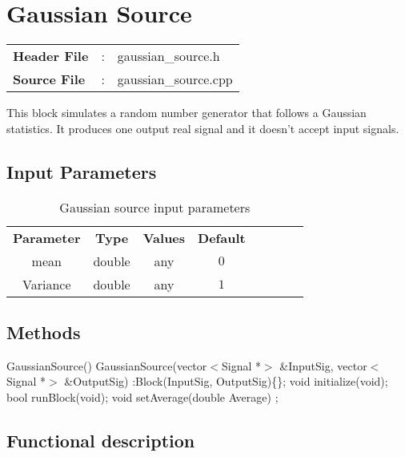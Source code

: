 \clearpage

\section{Gaussian Source}

\begin{tcolorbox}	
	\begin{tabular}{p{2.75cm} p{0.2cm} p{10.5cm}} 	
		\textbf{Header File}   &:& gaussian\_source.h \\
		\textbf{Source File}   &:& gaussian\_source.cpp \\
	\end{tabular}
\end{tcolorbox}

This block simulates a random number generator that follows a Gaussian statistics. It produces one output real signal and it doesn't accept input signals.

\subsection*{Input Parameters}

\begin{table}[h]
	\centering
	\begin{tabular}{|c|c|c|c|cccc}
		\cline{1-4}
		\textbf{Parameter} & \textbf{Type} & \textbf{Values} &   \textbf{Default}& \\ \cline{1-4}
		mean & double & any & $0$ \\ \cline{1-4}
		Variance & double & any & $1$ \\ \cline{1-4}
	\end{tabular}
	\caption{Gaussian source input parameters}
	\label{table_Gaussian_Source}
\end{table}


\subsection*{Methods}

GaussianSource() {}
\bigbreak
GaussianSource(vector$<$Signal *$>$ \&InputSig, vector$<$Signal *$>$ \&OutputSig) :Block(InputSig, OutputSig)\{\};
\bigbreak
void initialize(void);
\bigbreak
bool runBlock(void);
\bigbreak
void setAverage(double Average) ;

\subsection*{Functional description}

